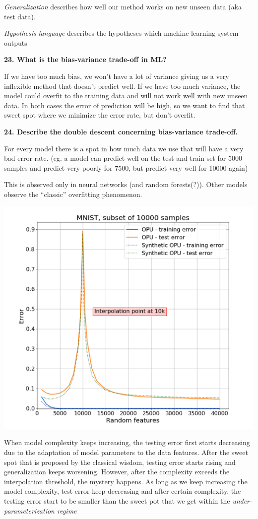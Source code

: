 \textit{Generalization} describes how well our method works on new
unseen data (aka test data).

\textit{Hypothesis language} describes the hypotheses which machine
learning system outputs

\textbf{23. What is the bias-variance trade-off in ML?}

If we have too much bias, we won't have a lot of variance giving us a
very inflexible method that doesn't predict well. If we have too much
variance, the model could overfit to the training data and will not work
well with new unseen data. In both cases the error of prediction will be
high, so we want to find that sweet spot where we minimize the error
rate, but don't overfit.

\textbf{24. Describe the double descent concerning bias-variance
trade-off.}

For every model there is a spot in how much data we use that will have a
very bad error rate. (eg. a model can predict well on the test and train
set for 5000 samples and predict very poorly for 7500, but predict very
well for 10000 again)

This is observed only in neural networks (and random forests(?)). Other
models observe the ``classic'' overfitting phenomenon.

\includegraphics[width=\columnwidth]{media/image1.png}

When model complexity keeps increasing, the testing error first starts
decreasing due to the adaptation of model parameters to the data
features. After the sweet spot that is proposed by the classical wisdom,
testing error starts rising and generalization keeps worsening. However,
after the complexity exceeds the interpolation threshold, the mystery
happens. As long as we keep increasing the model complexity, test error
keep decreasing and after certain complexity, the testing error start to
be smaller than the sweet pot that we get within the
\emph{under-parameterization regime}

